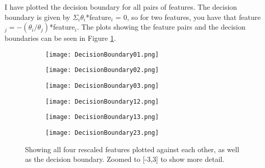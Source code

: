 

I have plotted the decision boundary for all pairs of features. 
The decision boundary is given by $\Sigma_i \theta_i$*feature$_i$ = 0, so for two features, you have that feature$_j = -(\theta_i/\theta_j)$*feature$_i$.
The plots showing the feature pairs and the decision boundaries can be seen in Figure \ref{fig:DB}.

\begin{figure}[ht!]
\begin{center}
        \begin{subfigure}{.49\textwidth}
      \centering
      \texttt{[image: DecisionBoundary01.png]}
    \end{subfigure}
    \vspace{-10pt}
    \begin{subfigure}{.49\textwidth}
      \centering
      \texttt{[image: DecisionBoundary02.png]}
    \end{subfigure}
     \vspace{-10pt}
    \begin{subfigure}{.49\textwidth}
      \centering
      \texttt{[image: DecisionBoundary03.png]}
    \end{subfigure}
     \vspace{-10pt}
    \begin{subfigure}{.49\textwidth}
      \centering
      \texttt{[image: DecisionBoundary12.png]}
    \end{subfigure}
         \vspace{-10pt}
    \begin{subfigure}{.49\textwidth}
      \centering
      \texttt{[image: DecisionBoundary13.png]}
    \end{subfigure}
     \vspace{-10pt}
    \begin{subfigure}{.49\textwidth}
      \centering
      \texttt{[image: DecisionBoundary23.png]}
    \end{subfigure}
    \caption{Showing all four rescaled features plotted against each other, as well as the decision boundary. Zoomed to [-3,3] to show more detail.}
    \label{fig:DB}
\end{center}
\end{figure}


